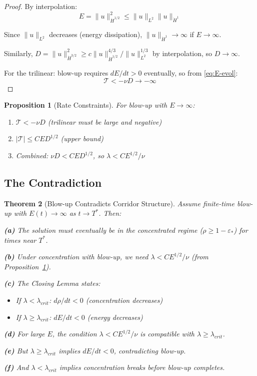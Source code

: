\documentclass[11pt]{article}
\newtheorem{theorem}{Theorem}
\newtheorem{proposition}[theorem]{Proposition}
\theoremstyle{definition}
\begin{document}
\begin{proof}
By interpolation:
\[
E = \|u\|_{\dot{H}^{1/2}}^2 \leq \|u\|_{L^2} \|u\|_{\dot{H}^1}
\]

Since $\|u\|_{L^2}$ decreases (energy dissipation), $\|u\|_{\dot{H}^1} \to \infty$ if $E \to \infty$.

Similarly, $D = \|u\|_{\dot{H}^{3/2}}^2 \geq c \|u\|_{\dot{H}^{1/2}}^{4/3} / \|u\|_{L^2}^{1/3}$ by interpolation, so $D \to \infty$.

For the trilinear: blow-up requires $dE/dt > 0$ eventually, so from \eqref{eq:E-evol}:
\[
\mathcal{T} < -\nu D \to -\infty
\]
\end{proof}

\begin{proposition}[Rate Constraints]\label{prop:rates}
For blow-up with $E \to \infty$:
\begin{enumerate}
\item $\mathcal{T} < -\nu D$ (trilinear must be large and negative)
\item $|\mathcal{T}| \leq CED^{1/2}$ (upper bound)
\item Combined: $\nu D < CED^{1/2}$, so $\lambda < CE^{1/2}/\nu$
\end{enumerate}
\end{proposition}

\subsection{The Contradiction}

\begin{theorem}[Blow-up Contradicts Corridor Structure]\label{thm:contradiction}
Assume finite-time blow-up with $E(t) \to \infty$ as $t \to T^*$. Then:

\textbf{(a)} The solution must eventually be in the concentrated regime ($\rho \geq 1 - \varepsilon_*$) for times near $T^*$.

\textbf{(b)} Under concentration with blow-up, we need $\lambda < CE^{1/2}/\nu$ (from Proposition~\ref{prop:rates}).

\textbf{(c)} The Closing Lemma states:
\begin{itemize}
\item If $\lambda < \lambda_{crit}$: $d\rho/dt < 0$ (concentration decreases)
\item If $\lambda \geq \lambda_{crit}$: $dE/dt < 0$ (energy decreases)
\end{itemize}

\textbf{(d)} For large $E$, the condition $\lambda < CE^{1/2}/\nu$ is compatible with $\lambda \geq \lambda_{crit}$.

\textbf{(e)} But $\lambda \geq \lambda_{crit}$ implies $dE/dt < 0$, contradicting blow-up.

\textbf{(f)} And $\lambda < \lambda_{crit}$ implies concentration breaks before blow-up completes.
\end{theorem}
\end{document}
